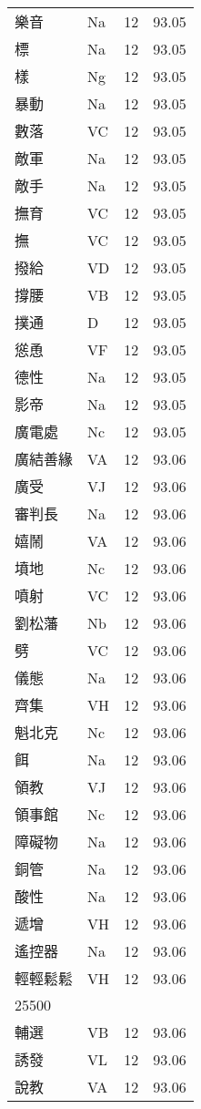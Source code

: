 \documentclass[twocolumn]{book}
\begin{document}
\begin{supertabular}{llrr}
樂音 & Na & 12 &  93.05\\
標 & Na & 12 &  93.05\\
樣 & Ng & 12 &  93.05\\
暴動 & Na & 12 &  93.05\\
數落 & VC & 12 &  93.05\\
敵軍 & Na & 12 &  93.05\\
敵手 & Na & 12 &  93.05\\
撫育 & VC & 12 &  93.05\\
撫 & VC & 12 &  93.05\\
撥給 & VD & 12 &  93.05\\
撐腰 & VB & 12 &  93.05\\
撲通 & D & 12 &  93.05\\
慫恿 & VF & 12 &  93.05\\
德性 & Na & 12 &  93.05\\
影帝 & Na & 12 &  93.05\\
廣電處 & Nc & 12 &  93.05\\
廣結善緣 & VA & 12 &  93.06\\
廣受 & VJ & 12 &  93.06\\
審判長 & Na & 12 &  93.06\\
嬉鬧 & VA & 12 &  93.06\\
墳地 & Nc & 12 &  93.06\\
噴射 & VC & 12 &  93.06\\
劉松藩 & Nb & 12 &  93.06\\
劈 & VC & 12 &  93.06\\
儀態 & Na & 12 &  93.06\\
齊集 & VH & 12 &  93.06\\
魁北克 & Nc & 12 &  93.06\\
餌 & Na & 12 &  93.06\\
領教 & VJ & 12 &  93.06\\
領事館 & Nc & 12 &  93.06\\
障礙物 & Na & 12 &  93.06\\
銅管 & Na & 12 &  93.06\\
酸性 & Na & 12 &  93.06\\
遞增 & VH & 12 &  93.06\\
遙控器 & Na & 12 &  93.06\\
輕輕鬆鬆 & VH & 12 &  93.06\\
25500\\
輔選 & VB & 12 &  93.06\\
誘發 & VL & 12 &  93.06\\
說教 & VA & 12 &  93.06\\

\end{supertabular}
\end{document}
